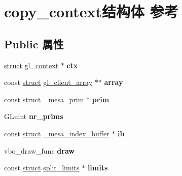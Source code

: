 \hypertarget{structcopy__context}{}\section{copy\+\_\+context结构体 参考}
\label{structcopy__context}
\subsection*{Public 属性}
\begin{DoxyCompactItemize}
\item 
\mbox{\label{structcopy__context_a436cfbc6c6b8ee9033f11e923a0f6d50}} 
\hyperlink{interfacestruct}{struct} \hyperlink{structgl__context}{gl\+\_\+context} $\ast$ {\bfseries ctx}
\item 
\mbox{\label{structcopy__context_ab657a2490a3cd60ff75203ff71b755b4}} 
const \hyperlink{interfacestruct}{struct} \hyperlink{structgl__client__array}{gl\+\_\+client\+\_\+array} $\ast$$\ast$ {\bfseries array}
\item 
\mbox{\label{structcopy__context_a155f2bfedfd86637b138e6666924fa54}} 
const \hyperlink{interfacestruct}{struct} \hyperlink{struct__mesa__prim}{\+\_\+mesa\+\_\+prim} $\ast$ {\bfseries prim}
\item 
\mbox{\label{structcopy__context_a64f9957d667800843da977ec61b90a69}} 
G\+Luint {\bfseries nr\+\_\+prims}
\item 
\mbox{\label{structcopy__context_ace64f30724edc855e2e6cc0925b11dce}} 
const \hyperlink{interfacestruct}{struct} \hyperlink{struct__mesa__index__buffer}{\+\_\+mesa\+\_\+index\+\_\+buffer} $\ast$ {\bfseries ib}
\item 
\mbox{\label{structcopy__context_a3604894f6a8c23917d68622a40640aaf}} 
vbo\+\_\+draw\+\_\+func {\bfseries draw}
\item 
\mbox{\label{structcopy__context_aecb92843269ff927e9af24adafd4b4ce}} 
const \hyperlink{interfacestruct}{struct} \hyperlink{structsplit__limits}{split\+\_\+limits} $\ast$ {\bfseries limits}
\item 
\mbox{\label{structcopy__context_a1cfac2fce1a4305fbab055d206d8d9ea}} 
$$
\end{DoxyCompactItemize}
